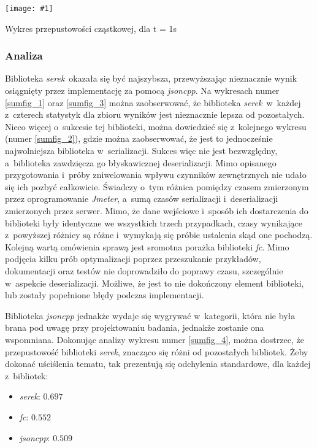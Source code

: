 \documentclass[12pt]{article}
\newcommand{\n}{\newline}
\newcommand{\putfig}[3]{
\begin{captioned}[H]
	\centering
	\texttt{[image: \#1]}
	\caption{#2}
	\label{#3}
	\medskip
\end{captioned}
}
\newcommand{\nonpl}[1]{{\it #1}}
\newcommand{\Jmeter}{\nonpl{Jmeter}\texttrademark}
\newcommand{\serek}{\nonpl{serek}}
\begin{document}
{{{				{
					\putfig{./charts/output_with_charts_as_images/throughput_per_library.png}{ Wykres przepustowości cząstkowej, dla \Delta t  = 1s}{sumfig_4}
				}
			}

			{
				\subsubsection{Analiza}

				Biblioteka \serek\  okazała się być najszybsza, przewyższając nieznacznie wynik osiągnięty przez implementację za pomocą \nonpl{jsoncpp}. Na wykresach numer \ref{sumfig_1} oraz \ref{sumfig_3}
				można zaobserwować, że biblioteka \serek\ w~każdej z~czterech statystyk dla zbioru wyników jest nieznacznie lepsza od pozostałych. Nieco więcej o~sukcesie tej biblioteki,
				można dowiedzieć się z~kolejnego wykresu (numer \ref{sumfig_2}), gdzie można zaobserwować, że jest to jednocześnie najwolniejsza biblioteka w~serializacji.
				Sukces więc nie jest bezwzględny, a~biblioteka zawdzięcza go błyskawicznej deserializacji. Mimo opisanego przygotowania i~próby zniwelowania wpływu
				czynników zewnętrznych nie udało się ich pozbyć całkowicie. Świadczy o~tym różnica pomiędzy czasem zmierzonym przez oprogramowanie \Jmeter, a~sumą czasów
				serializacji i~deserializacji zmierzonych przez serwer. Mimo, że dane wejściowe i~sposób ich dostarczenia do biblioteki były identyczne
				we wszystkich trzech przypadkach, czasy wynikające z~powyższej różnicy są różne i~wymykają się próbie ustalenia skąd one pochodzą. Kolejną wartą omówienia sprawą
				jest sromotna porażka biblioteki \nonpl{fc}. Mimo podjęcia kilku prób optymalizacji poprzez przeszukanie przykładów, dokumentacji
				oraz testów nie doprowadziło do poprawy czasu, szczególnie w~aspekcie deserializacji. Możliwe, że jest to nie dokończony element biblioteki, lub zostały popełnione
				błędy podczas implementacji.\n

				Biblioteka \nonpl{jsoncpp} jednakże wydaje się wygrywać w~kategorii, która nie była brana pod uwagę przy projektowaniu badania, jednakże zostanie
				ona wspomniana. Dokonując analizy wykresu numer \ref{sumfig_4}, można dostrzec, że przepustowość biblioteki \serek, znacząco się różni od pozostałych bibliotek.
				Żeby dokonać uściślenia tematu, tak prezentują się odchylenia standardowe, dla każdej z~bibliotek:

				{
					\begin{itemize}
						\setlength\itemsep{0mm}
						\item \serek: $0.697$
						\item \nonpl{fc}: $0.552$
						\item \nonpl{jsoncpp}: $0.509$
					\end{itemize}
				}

}}}
\end{document}

